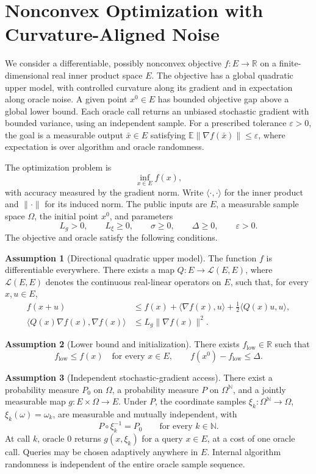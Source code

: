 \documentclass[10pt]{article}
\theoremstyle{definition}
\newtheorem{assumption}{Assumption}
\begin{document}
\section*{Nonconvex Optimization with Curvature-Aligned Noise}
We consider a differentiable, possibly nonconvex objective $f:E\to\mathbb{R}$ on a finite-dimensional real inner product space $E$. The objective has a global quadratic upper model, with controlled curvature along its gradient and in expectation along oracle noise. A given point $x^0\in E$ has bounded objective gap above a global lower bound. Each oracle call returns an unbiased stochastic gradient with bounded variance, using an independent sample. For a prescribed tolerance $\varepsilon>0$, the goal is a measurable output $\bar{x}\in E$ satisfying $\mathbb{E}\|\nabla f(\bar{x})\|\leq\varepsilon$, where expectation is over algorithm and oracle randomness.

The optimization problem is
\[
\inf_{x\in E} f(x),
\]
with accuracy measured by the gradient norm. Write $\langle\cdot,\cdot\rangle$ for the inner product and $\|\cdot\|$ for its induced norm. The public inputs are $E$, a measurable sample space $\Omega$, the initial point $x^0$, and parameters
\[
L_g>0,\qquad L_\xi\geq 0,\qquad \sigma\geq 0,
\qquad \Delta\geq 0,\qquad \varepsilon>0.
\]
The objective and oracle satisfy the following conditions.

\begin{assumption}[Directional quadratic upper model]
The function $f$ is differentiable everywhere. There exists a map $Q:E\to\mathcal{L}(E,E)$, where $\mathcal{L}(E,E)$ denotes the continuous real-linear operators on $E$, such that, for every $x,u\in E$,
\begin{align*}
f(x+u)&\leq f(x)+\langle\nabla f(x),u\rangle
 +\tfrac12\langle Q(x)u,u\rangle,\\
\langle Q(x)\nabla f(x),\nabla f(x)\rangle
 &\leq L_g\|\nabla f(x)\|^2.
\end{align*}
\end{assumption}

\begin{assumption}[Lower bound and initialization]
There exists $f_{\mathrm{low}}\in\mathbb{R}$ such that
\[
f_{\mathrm{low}}\leq f(x)\quad\text{for every }x\in E,
\qquad f(x^0)-f_{\mathrm{low}}\leq\Delta.
\]
\end{assumption}

\begin{assumption}[Independent stochastic-gradient access]
There exist a probability measure $P_0$ on $\Omega$, a probability measure $P$ on $\Omega^{\mathbb{N}}$, and a jointly measurable map $g:E\times\Omega\to E$. Under $P$, the coordinate samples $\xi_k:\Omega^{\mathbb{N}}\to\Omega$, $\xi_k(\omega)=\omega_k$, are measurable and mutually independent, with
\[
P\circ\xi_k^{-1}=P_0\qquad\text{for every }k\in\mathbb{N}.
\]
At call $k$, oracle $0$ returns $g(x,\xi_k)$ for a query $x\in E$, at a cost of one oracle call. Queries may be chosen adaptively anywhere in $E$. Internal algorithm randomness is independent of the entire oracle sample sequence.
\end{assumption}
\end{document}
